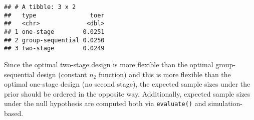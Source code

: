 \documentclass[
]{book}
\newenvironment{Shaded}{\begin{snugshade}}{\end{snugshade}}
\newcommand{\DataTypeTok}[1]{\textcolor[rgb]{0.13,0.29,0.53}{#1}}
\newcommand{\DecValTok}[1]{\textcolor[rgb]{0.00,0.00,0.81}{#1}}
\newcommand{\FloatTok}[1]{\textcolor[rgb]{0.00,0.00,0.81}{#1}}
\newcommand{\KeywordTok}[1]{\textcolor[rgb]{0.13,0.29,0.53}{\textbf{#1}}}
\newcommand{\NormalTok}[1]{#1}
\newcommand{\OperatorTok}[1]{\textcolor[rgb]{0.81,0.36,0.00}{\textbf{#1}}}
\newcommand{\StringTok}[1]{\textcolor[rgb]{0.31,0.60,0.02}{#1}}
\begin{document}
\begin{Shaded}
\end{Shaded}

\begin{verbatim}
## # A tibble: 3 x 2
##   type               toer
##   <chr>             <dbl>
## 1 one-stage        0.0251
## 2 group-sequential 0.0250
## 3 two-stage        0.0249
\end{verbatim}

Since the optimal two-stage design is more flexible than the optimal
group-sequential design (constant \(n_2\) function) and this is
more flexible than the optimal one-stage design (no second stage),
the expected sample sizes under the prior should be ordered in the opposite way.
Additionally, expected sample sizes under the null hypothesis
are computed both via \texttt{evaluate()} and simulation-based.
\end{document}
